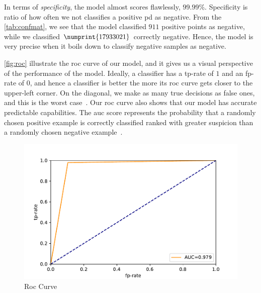 In terms of \emph{specificity}, the model almost scores flawlessly, $99.99\%$. Specificity is ratio of how often we not classifies a positive \ac{pd} as negative. From the \autoref{tab:confmat}, we see that the model classified $911$ positive points as negative, while we classified $\numprint{17933021}$ correctly negative. Hence, the model is very precise when it boils down to classify negative samples as negative.

\autoref{fig:roc} illustrate the \ac{roc} curve of our model, and it gives us a visual perspective of the performance of the model. Ideally, a classifier has a tp-rate of $1$ and an fp-rate of $0$, and hence a classifier is better the more its \ac{roc} curve gets closer to the upper-left corner. On the diagonal, we make as many true decisions as false ones, and this is the worst case~\cite[p.~563]{alpaydin2014introduction}. Our \ac{roc} curve also shows that our model has accurate predictable capabilities. The \ac{auc} score represents the probability that a randomly chosen positive example is correctly classified ranked with greater suspicion than a randomly chosen negative example~\cite{bradley1997use}.
\begin{figure}[ht]
    \centering
    \includegraphics[width=\textwidth]{results/roc.pdf}
    \caption{Roc Curve}
    \label{fig:roc}
\end{figure} 

